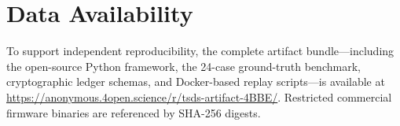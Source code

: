 \section{Data Availability}
\label{sec:data-availability}

To support independent reproducibility, the complete \tool artifact bundle---including the open-source Python framework, the 24-case ground-truth benchmark, cryptographic ledger schemas, and Docker-based replay scripts---is available at \url{https://anonymous.4open.science/r/tsds-artifact-4BBE/}. Restricted commercial firmware binaries are referenced by SHA-256 digests.
